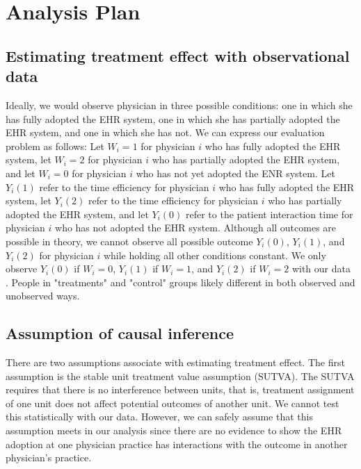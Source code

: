\section{Analysis Plan}
\subsection{Estimating treatment effect with observational data}
Ideally, we would observe physician in three possible conditions: one in which she has fully adopted the EHR system, one in which she has partially adopted the EHR system, and one in which she has not. We can express our evaluation problem as follows: Let $W_i = 1$ for physician $i$ who has fully adopted the EHR system, let $W_i = 2$ for physician $i$ who has partially adopted the EHR system, and let $W_i = 0$ for physician $i$ who has not yet adopted the ENR system. Let $Y_i(1)$ refer to the time efficiency for physician $i$ who has fully adopted the EHR system, let $Y_i(2)$ refer to the time efficiency for physician $i$ who has partially adopted the EHR system, and let $Y_i(0)$ refer to the patient interaction time for physician $i$ who has not adopted the EHR system. Although all outcomes are possible in theory, we cannot observe all possible outcome $Y_i(0)$, $Y_i(1)$, and $Y_i(2)$ for physician $i$ while holding all other conditions constant. We only observe $Y_i(0)$ if $W_i = 0$, $Y_i(1)$ if $W_i = 1$, and $Y_i(2)$ if $W_i = 2$ with our data \citep{imbens2008recent}. People in "treatments" and "control" groups likely different in both observed and unobserved ways.

\subsection{Assumption of causal inference}
There are two assumptions associate with estimating treatment effect. The first assumption is the stable unit treatment value assumption (SUTVA). The SUTVA requires that there is no interference between units, that is, treatment assignment of one unit does not affect potential outcomes of another unit. We cannot test this statistically with our data. However, we can safely assume that this assumption meets in our analysis since there are no evidence to show the EHR adoption at one physician practice has interactions with the outcome in another physician's practice.

